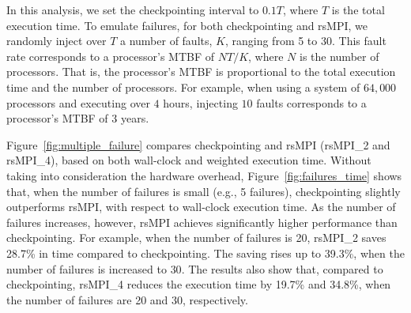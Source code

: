
In this analysis, we set the checkpointing interval to $0.1T$, where $T$ is the total execution time. To emulate failures, for both checkpointing and rsMPI, we randomly inject over $T$ a number of faults, $K$, ranging from 5 to 30. This fault rate corresponds to a processor's MTBF of $NT/K$, where $N$ is the number of processors. That is, the processor's MTBF is proportional to the total execution time and the number of processors. For example, %
when using a system of $64,000$ processors and executing over $4$ hours, injecting $10$ faults corresponds to a processor's MTBF of $3$ years.

Figure~\ref{fig:multiple_failure} compares checkpointing and rsMPI (rsMPI\_2 and rsMPI\_4), based on both wall-clock and weighted execution time. Without taking into consideration the hardware overhead, Figure~\ref{fig:failures_time} shows that, when the number of failures is small (e.g., 5 failures), checkpointing slightly outperforms rsMPI,  with respect to wall-clock execution time. As the number of failures increases, however, rsMPI achieves significantly higher performance than checkpointing. For example, when the number of failures is 20, rsMPI\_2 saves 28.7\% in time compared to checkpointing. The saving rises up to 39.3\%, when the number of failures is increased to $30$. The results also show that, compared to checkpointing, rsMPI\_4 reduces the execution time by 19.7\% and 34.8\%, when the number of failures are 20 and 30, respectively. 

